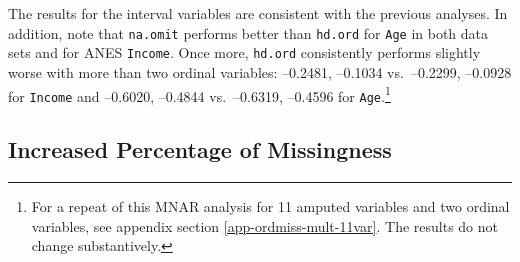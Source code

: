 \documentclass[12pt,econ]{sources/authesis}
\begin{document}
The results for the interval variables are consistent with the previous analyses. In addition, note that \texttt{na.omit} performs better than \texttt{hd.ord} for \texttt{Age} in both data sets and for ANES \texttt{Income}. Once more, \texttt{hd.ord} consistently performs slightly worse with more than two ordinal variables: --0.2481, --0.1034 vs.~--0.2299, --0.0928 for \texttt{Income} and --0.6020, --0.4844 vs.~--0.6319, --0.4596 for \texttt{Age}.\footnote{For a repeat of this MNAR analysis for 11 amputed variables and two ordinal variables, see appendix section \ref{app-ordmiss-mult-11var}. The results do not change substantively.}

\hypertarget{ordmiss-results-increaseNA}{%
\subsection{Increased Percentage of Missingness}\label{ordmiss-results-increaseNA}}
\end{document}
